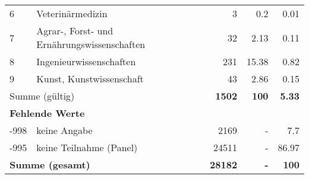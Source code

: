 \begin{longtable}{lXrrr}
     6 &
     \multicolumn{1}{X}{ Veterinärmedizin   } &


       \num{3} &
       \num[round-mode=places,round-precision=2]{0.2} &
         \num[round-mode=places,round-precision=2]{0.01} \\

     7 &
     \multicolumn{1}{X}{ Agrar-, Forst- und Ernährungswissenschaften   } &


       \num{32} &
       \num[round-mode=places,round-precision=2]{2.13} &
         \num[round-mode=places,round-precision=2]{0.11} \\

     8 &
     \multicolumn{1}{X}{ Ingenieurwissenschaften   } &


       \num{231} &
       \num[round-mode=places,round-precision=2]{15.38} &
         \num[round-mode=places,round-precision=2]{0.82} \\

     9 &
     \multicolumn{1}{X}{ Kunst, Kunstwissenschaft   } &


       \num{43} &
       \num[round-mode=places,round-precision=2]{2.86} &
         \num[round-mode=places,round-precision=2]{0.15} \\
     \midrule
     \multicolumn{2}{l}{Summe (gültig)} &
       \textbf{\num{1502}} &
     \textbf{\num{100}} &
       \textbf{\num[round-mode=places,round-precision=2]{5.33}} \\
     \multicolumn{5}{l}{\textbf{Fehlende Werte}}\\
       -998 &
       keine Angabe &
         \num{2169} &
        - &
         \num[round-mode=places,round-precision=2]{7.7} \\
       -995 &
       keine Teilnahme (Panel) &
         \num{24511} &
        - &
         \num[round-mode=places,round-precision=2]{86.97} \\
     \midrule
     \multicolumn{2}{l}{\textbf{Summe (gesamt)}} &
          \textbf{\num{28182}} &
        \textbf{-} &
        \textbf{\num{100}} \\
     \bottomrule
     \end{longtable}
     
